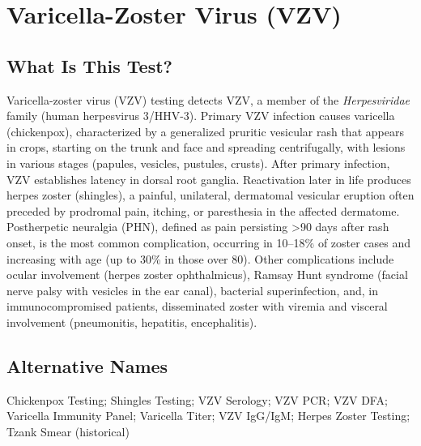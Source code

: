 \chapter{Varicella-Zoster Virus (VZV)}

\section*{What Is This Test?}
Varicella-zoster virus (VZV) testing detects VZV, a member of the \textit{Herpesviridae} family (human herpesvirus 3/HHV-3). Primary VZV infection causes varicella (chickenpox), characterized by a generalized pruritic vesicular rash that appears in crops, starting on the trunk and face and spreading centrifugally, with lesions in various stages (papules, vesicles, pustules, crusts). After primary infection, VZV establishes latency in dorsal root ganglia. Reactivation later in life produces herpes zoster (shingles), a painful, unilateral, dermatomal vesicular eruption often preceded by prodromal pain, itching, or paresthesia in the affected dermatome. Postherpetic neuralgia (PHN), defined as pain persisting >90 days after rash onset, is the most common complication, occurring in 10--18\% of zoster cases and increasing with age (up to 30\% in those over 80). Other complications include ocular involvement (herpes zoster ophthalmicus), Ramsay Hunt syndrome (facial nerve palsy with vesicles in the ear canal), bacterial superinfection, and, in immunocompromised patients, disseminated zoster with viremia and visceral involvement (pneumonitis, hepatitis, encephalitis).

\section*{Alternative Names}
Chickenpox Testing; Shingles Testing; VZV Serology; VZV PCR; VZV DFA; Varicella Immunity Panel; Varicella Titer; VZV IgG/IgM; Herpes Zoster Testing; Tzank Smear (historical)

